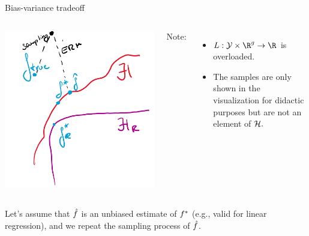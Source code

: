 \documentclass[11pt,compress,t,notes=noshow, xcolor=table]{beamer}
\begin{document}
\begin{vbframe}{Bias-variance tradeoff}
\begin{columns}[onlytextwidth,T]
  \includegraphics[width=1.0\textwidth]{figure_man/to_replace_sampling.png}

      \lz
      Note: \\
      \begin{itemize}
          \item $L:\Yspace\times\R^g\rightarrow\R$ is overloaded.
          \item The samples are only shown in the visualization for didactic purposes but are not an element of $\mathcal{H}.$
      \end{itemize}
    \end{columns}

\framebreak

Let's assume that $\hat{f}$ is an unbiased estimate of $f^{\ast}$ (e.g., valid for linear regression), and we repeat the sampling process of $\hat{f}$.

\begin{columns}[onlytextwidth,T]


\end{columns}
\end{vbframe}
\end{document}
